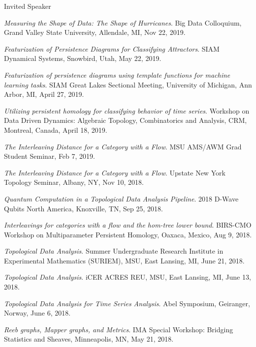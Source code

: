 \documentclass{resume} %
\begin{document}
\begin{rSection}{Invited Speaker}
\begin{etaremune}
\item\emph{Measuring the Shape of Data: The Shape of Hurricanes}. Big Data Colloquium, Grand Valley State University, Allendale, MI, Nov 22, 2019. 

\item\emph{Featurization of Persistence Diagrams for Classifying Attractors}. SIAM Dynamical Systems, Snowbird, Utah, May 22, 2019. 

\item\emph{Featurization of persistence diagrams using template functions for machine learning tasks}. SIAM Great Lakes Sectional Meeting, University of Michigan, Ann Arbor, MI, April 27, 2019. 

\item\emph{Utilizing persistent homology for classifying behavior of time series}. Workshop on Data Driven Dynamics: Algebraic Topology, Combinatorics and Analysis, CRM, Montreal, Canada, April 18, 2019. 

\item\emph{The Interleaving Distance for a Category with a Flow}. MSU AMS/AWM Grad Student Seminar, Feb 7, 2019. 

\item\emph{The Interleaving Distance for a Category with a Flow}. Upstate New York Topology Seminar, Albany, NY, Nov 10, 2018. 

\item\emph{Quantum Computation in a Topological Data Analysis Pipeline}. 2018 D-Wave Qubits North America, Knoxville, TN, Sep 25, 2018. 

\item\emph{Interleavings for categories with a flow and the hom-tree lower bound}. BIRS-CMO Workshop on Multiparameter Persistent Homology, Oaxaca, Mexico, Aug 9, 2018. 

\item\emph{Topological Data Analysis}. Summer Undergraduate Research Institute in Experimental Mathematics (SURIEM), MSU, East Lansing, MI, June 21, 2018. 

\item\emph{Topological Data Analysis}. iCER ACRES REU, MSU, East Lansing, MI, June 13, 2018. 

\item\emph{Topological Data Analysis for Time Series Analysis}. Abel Symposium, Geiranger, Norway, June 6, 2018. 

\item\emph{Reeb graphs, Mapper graphs, and Metrics}. IMA Special Workshop: Bridging Statistics and Sheaves, Minneapolis, MN, May 21, 2018. 


\end{etaremune}
\end{rSection}
\end{document}
